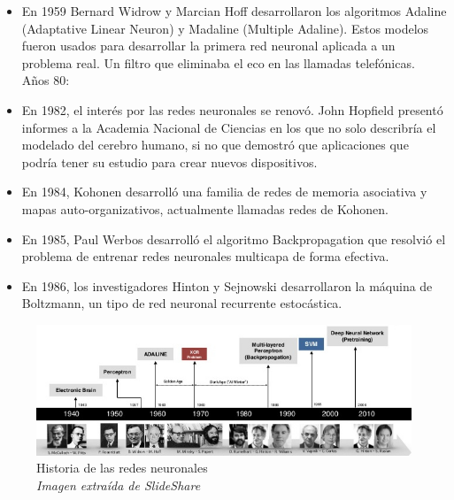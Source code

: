 \begin{itemize}
\item En 1959 Bernard Widrow y Marcian Hoff desarrollaron los algoritmos Adaline (Adaptative Linear Neuron) y Madaline (Multiple Adaline). Estos modelos fueron usados para desarrollar la primera red neuronal aplicada a un problema real. Un filtro que eliminaba el eco en las llamadas telefónicas.
\\Años 80:\\
\item En 1982, el interés por las redes neuronales se renovó. John Hopfield presentó informes a la Academia Nacional de Ciencias en los que no solo describría el modelado del cerebro humano, si no que demostró que aplicaciones que podría tener su estudio para crear nuevos dispositivos.
\item En 1984, Kohonen desarrolló una familia de redes de memoria asociativa y mapas auto-organizativos, actualmente llamadas redes de Kohonen.
\item En 1985, Paul Werbos desarrolló el algoritmo Backpropagation que resolvió el problema de entrenar redes neuronales multicapa de forma efectiva.
\item En 1986, los investigadores Hinton y Sejnowski desarrollaron la máquina de Boltzmann, un tipo de red neuronal recurrente estocástica.
\end{itemize}

\begin{figure}[htp]
\centering
\includegraphics[scale=0.60]{images/history.jpg}
\caption{Historia de las redes neuronales\\\textit{Imagen extraída de SlideShare}}
\end{figure}

